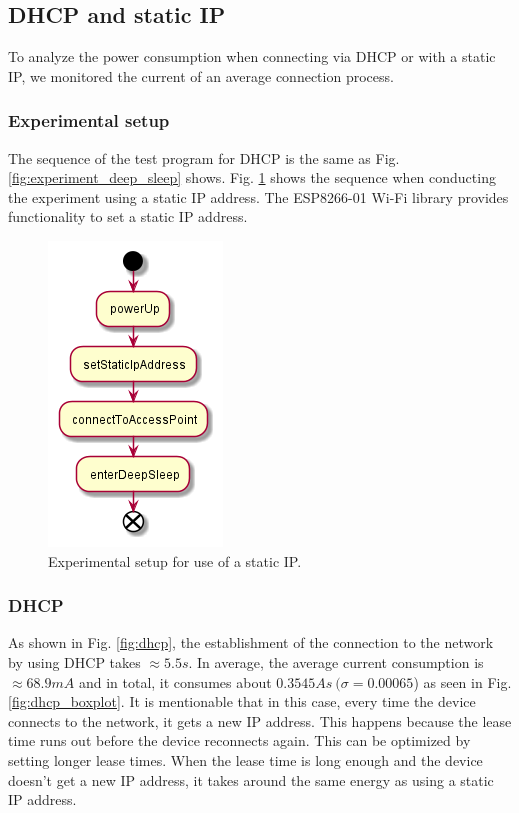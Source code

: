 \subsection{DHCP and static IP}
To analyze the power consumption when connecting via DHCP or with a static IP, we monitored the current of an average connection process.\\

\subsubsection{Experimental setup}
The sequence of the test program for DHCP is the same as Fig. \ref{fig:experiment_deep_sleep} shows.
Fig. \ref{fig:experiment_static_ip} shows the sequence when conducting the experiment using a static IP address.
The ESP8266-01 Wi-Fi library provides functionality to set a static IP address.
\begin{figure}[H]
    \centering
    \includegraphics[width = 0.35 \linewidth]{fig/sequence_static_ip.png}
    \caption{Experimental setup for use of a static IP.}
    \label{fig:experiment_static_ip}
\end{figure}

\subsubsection{DHCP}
As shown in Fig. \ref{fig:dhcp}, the establishment of the connection to the network by using DHCP takes $\approx 5.5 s$.
In average, the average current consumption is $\approx 68.9 mA$ and in total, it consumes about $0.3545 As\ (\sigma = 0.00065$) as seen in Fig. \ref{fig:dhcp_boxplot}.
It is mentionable that in this case, every time the device connects to the network, it gets a new IP address.
This happens because the lease time runs out before the device reconnects again.
This can be optimized by setting longer lease times.
When the lease time is long enough and the device doesn't get a new IP address, it takes around the same energy as using a static IP address.\\

